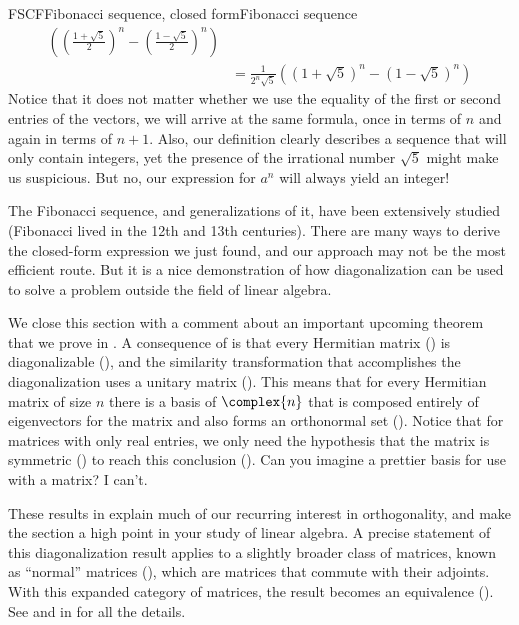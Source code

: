 \begin{example}{FSCF}{Fibonacci sequence, closed form}{Fibonacci sequence}
\begin{align*}
\left(\left(\frac{1+\sqrt{5}}{2}\right)^n-\left(\frac{1-\sqrt{5}}{2}\right)^n\right)\\
&=\frac{1}{2^n\sqrt{5}}
\left(\left(1+\sqrt{5}\right)^n-\left(1-\sqrt{5}\right)^n\right)
\end{align*}
%
Notice that it does not matter whether we use the equality of the first or second entries of the vectors, we will arrive at the same formula, once in terms of $n$ and again in terms of $n+1$.  Also, our definition clearly describes a sequence that will only contain integers, yet the presence of the irrational number $\sqrt{5}$ might make us suspicious.  But no, our expression for $a^n$ will always yield an integer!\par
%
The Fibonacci sequence, and generalizations of it, have been extensively studied (Fibonacci lived in the 12th and 13th centuries).  There are many ways to derive the closed-form expression we just found, and our approach may not be the most efficient route.  But it is a nice demonstration of how diagonalization can be used to solve a problem outside the field of linear algebra.
\end{example}
%
We close this section with a comment about an important upcoming theorem that we prove in .  A consequence of  is that every Hermitian matrix () is diagonalizable (), and the similarity transformation that accomplishes the diagonalization uses a unitary matrix ().  This means that for every Hermitian matrix of size $n$ there is a basis of $\complex{n}$  that is composed entirely of eigenvectors for the matrix and also forms an orthonormal set ().  Notice that for matrices with only real entries, we only need the hypothesis that the matrix is symmetric () to reach this conclusion ().  Can you imagine a prettier basis for use with a matrix?  I can't.\par
%
These results in  explain much of our recurring interest in orthogonality, and make the section a high point in your study of linear algebra.  A precise statement of this diagonalization result applies to a slightly broader class of matrices, known as ``normal'' matrices (), which are matrices that commute with their adjoints.  With this expanded category of matrices, the result becomes an equivalence ().  See  and  in  for all the details.
%
%
